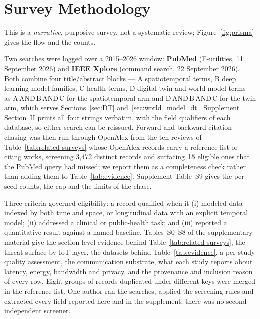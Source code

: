 \documentclass[journal]{IEEEtran}
\begin{document}
\fi


\section{Survey Methodology}
\label{sec:method}
This is a \emph{narrative}, purposive survey, not a systematic review; Figure~\ref{fig:prisma} gives the flow and the counts.

Two searches were logged over a 2015--2026 window: \textbf{PubMed} (E-utilities, 11 September 2026) and \textbf{IEEE Xplore} (command search, 22 September 2026). Both combine four title/abstract blocks --- A spatiotemporal terms, B deep learning model families, C health terms, D digital twin and world model terms --- as A\,AND\,B\,AND\,C for the spatiotemporal arm and D\,AND\,B\,AND\,C for the twin arm, which serves Sections~\ref{sec:DT} and~\ref{sec:world_model_dt}. Supplement Section~II prints all four strings verbatim, with the field qualifiers of each database, so either search can be reissued. Forward and backward citation chasing was then run through OpenAlex from the ten reviews of Table~\ref{tab:related-surveys} whose OpenAlex records carry a reference list or citing works, screening 3{,}472 distinct records and surfacing \textbf{15} eligible ones that the PubMed query had missed; we report them as a completeness check rather than adding them to Table~\ref{tab:evidence}. Supplement Table~S9 gives the per-seed counts, the cap and the limits of the chase.

Three criteria governed eligibility: a record qualified when it (i) modeled data indexed by both time and space, or longitudinal data with an explicit temporal model; (ii) addressed a clinical or public-health task; and (iii) reported a quantitative result against a named baseline. Tables~S0--S8 of the supplementary material give the section-level evidence behind Table~\ref{tab:related-surveys}, the threat surface by IoT layer, the datasets behind Table~\ref{tab:evidence}, a per-study quality assessment, the communication substrate, what each study reports about latency, energy, bandwidth and privacy, and the provenance and inclusion reason of every row. Eight groups of records duplicated under different keys were merged in the reference list. One author ran the searches, applied the screening rules and extracted every field reported here and in the supplement; there was no second independent screener.
\end{document}
